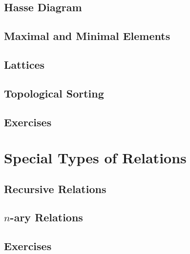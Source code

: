 \subsection{Hasse Diagram}


\subsection{Maximal and Minimal Elements}


\subsection{Lattices}

\subsection{Topological Sorting}




\subsection{Exercises}
\section{Special Types of Relations}
\subsection{Recursive Relations}
\subsection{\(n\)-ary Relations}

\subsection{Exercises}



